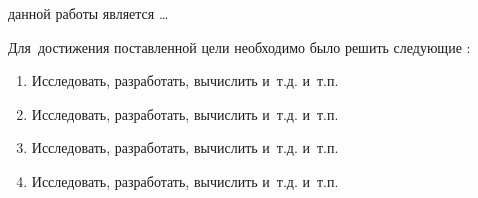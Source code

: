 


{\aim} данной работы является \ldots

Для~достижения поставленной цели необходимо было решить следующие {\tasks}:
\begin{enumerate}[beginpenalty=10000] %
  \item Исследовать, разработать, вычислить и~т.\:д. и~т.\:п.
  \item Исследовать, разработать, вычислить и~т.\:д. и~т.\:п.
  \item Исследовать, разработать, вычислить и~т.\:д. и~т.\:п.
  \item Исследовать, разработать, вычислить и~т.\:д. и~т.\:п.
\end{enumerate}


